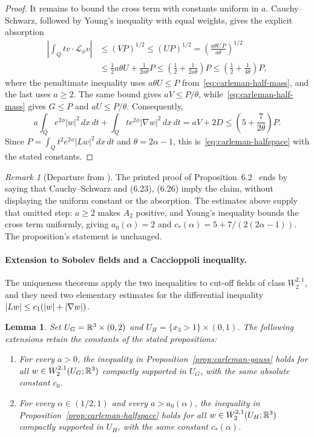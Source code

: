 \documentclass[11pt,letterpaper]{article}
\numberwithin{equation}{section}
\theoremstyle{plain}
\newtheorem{lemma}[theorem]{Lemma}
\theoremstyle{definition}
\theoremstyle{remark}
\newtheorem{remark}[theorem]{Remark}
\begin{document}
\begin{proof}
It remains to bound the cross term with constants uniform in $a$. Cauchy--Schwarz, followed by Young's inequality with equal weights, gives the explicit absorption
\begin{align*}
 \left|\int_Qtv\cdot\mathcal L_\phi v\right|
 &\le (VP)^{1/2}\le(UP)^{1/2}
   =\left(\frac{a\theta U\,P}{a\theta}\right)^{1/2}\\
 &\le\frac12a\theta U+\frac{1}{2a\theta}P
 \le\left(\frac12+\frac{1}{2a\theta}\right)P
 \le\left(\frac12+\frac{1}{4\theta}\right)P,
\end{align*}
where the penultimate inequality uses $a\theta U\le P$ from~\eqref{eq:carleman-half-mass}, and the last uses $a\ge2$. The same bound gives $aV\le P/\theta$, while~\eqref{eq:carleman-half-mass} gives $G\le P$ and $aU\le P/\theta$. Consequently,
\[
 a\int_Qe^{2\phi}|w|^2\,dx\,dt+\int_Qte^{2\phi}|\nabla w|^2\,dx\,dt
 =aV+2D
 \le\left(5+\frac{7}{2\theta}\right)P.
\]
Since $P=\int_Qt^2e^{2\phi}|Lw|^2\,dx\,dt$ and $\theta=2\alpha-1$, this is~\eqref{eq:carleman-halfspace} with the stated constants.
\end{proof}

\begin{remark}[Departure from \cite{ESS2003}]
The printed proof of Proposition~6.2~\cite[pp.~240--243]{ESS2003} ends by saying that Cauchy--Schwarz and (6.23), (6.26) imply the claim, without displaying the uniform constant or the absorption. The estimates above supply that omitted step: $a\ge2$ makes $A_2$ positive, and Young's inequality bounds the cross term uniformly, giving $a_0(\alpha)=2$ and $c_*(\alpha)=5+7/(2(2\alpha-1))$. The proposition's statement is unchanged.
\end{remark}

\paragraph{Extension to Sobolev fields and a Caccioppoli inequality.}
The uniqueness theorems apply the two inequalities to cut-off fields of class $W^{2,1}_2$, and they need two elementary estimates for the differential inequality $\left\lvert L w\right\rvert\le c_1(\left\lvert w\right\rvert+\left\lvert \nabla w\right\rvert)$.

\begin{lemma}\label{lem:carleman-sobolev}
Set $U_G=\mathbb{R}^3\times(0,2)$ and $U_H=\{x_3>1\}\times(0,1)$. The following extensions retain the constants of the stated propositions:
\begin{enumerate}
\item For every $a>0$, the inequality in Proposition~\ref{prop:carleman-gauss} holds for all $w\in W^{2,1}_2(U_G;\mathbb{R}^3)$ compactly supported in $U_G$, with the same absolute constant $c_0$.
\item For every $\alpha\in(1/2,1)$ and every $a>a_0(\alpha)$, the inequality in Proposition~\ref{prop:carleman-halfspace} holds for all $w\in W^{2,1}_2(U_H;\mathbb{R}^3)$ compactly supported in $U_H$, with the same constant $c_*(\alpha)$.
\end{enumerate}
\end{lemma}
\end{document}
